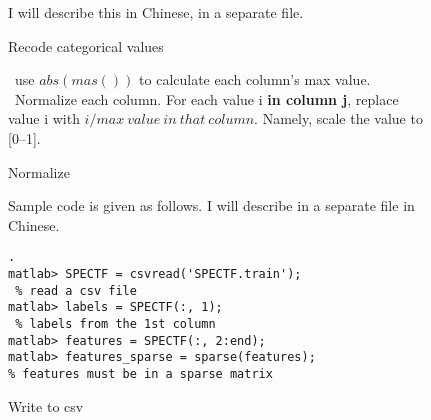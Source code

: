 \documentclass{article}
\begin{document}
\begin{figure}[htbp]
  \centering
  I will describe this in Chinese, in a separate file.
  \caption{Recode categorical values}
\end{figure}


\begin{figure}[htbp]
  \centering
  \begin{algorithmic}[1]
    \STATE~use $abs(mas())$ to calculate each column's max value.
    \STATE~Normalize each column. For each value i \textbf{in column
      j}, replace value i with $i / max~value~in~that~column$. Namely,
    scale the value to [0--1].
  \end{algorithmic}
  \caption{Normalize}
\end{figure}

\begin{figure}[htbp]
  \centering
Sample code is given as follows. I will describe in a separate file in
Chinese. 
\begin{verbatim}.
matlab> SPECTF = csvread('SPECTF.train');
 % read a csv file
matlab> labels = SPECTF(:, 1);
 % labels from the 1st column
matlab> features = SPECTF(:, 2:end); 
matlab> features_sparse = sparse(features); 
% features must be in a sparse matrix
\end{verbatim}
  \caption{Write to csv}
\end{figure}
\end{document}
